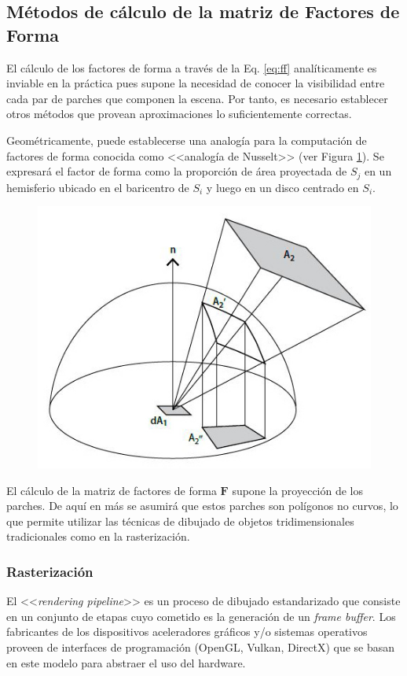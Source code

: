 \subsection{Métodos de cálculo de la matriz de Factores de Forma}
\label{sec:calculoff}

El cálculo de los factores de forma a través de la Eq. \eqref{eq:ff} analíticamente es inviable en la práctica pues supone la necesidad de conocer la visibilidad entre cada par de parches que componen la escena. Por tanto, es necesario establecer otros métodos que provean aproximaciones lo suficientemente correctas.

Geométricamente, puede establecerse una analogía para la computación de factores de forma conocida como <<analogía de Nusselt>> (ver Figura \ref{img:nusselt}). Se expresará el factor de forma como la proporción de área proyectada de $S_{j}$ en un hemisferio ubicado en el baricentro de $S_{i}$ y luego en un disco centrado en $S_{i}$.

\begin{figure}[H]
	\centering
	\includegraphics[width=0.55\linewidth]{assets/nusselt}
	\label{img:nusselt}
\end{figure}

El cálculo de la matriz de factores de forma $\mathbf{F}$ supone la proyección de los parches. De aquí en más se asumirá que estos parches son polígonos no curvos, lo que permite utilizar las técnicas de dibujado de objetos tridimensionales tradicionales como en la rasterización.

\subsubsection{Rasterización}
\label{sec:rasterizacion}

El <<\textit{rendering pipeline}>> es un proceso de dibujado estandarizado que consiste en un conjunto de etapas cuyo cometido es la generación de un \textit{frame buffer}. Los fabricantes de los dispositivos aceleradores gráficos y/o sistemas operativos proveen de interfaces de programación (OpenGL, Vulkan, DirectX) que se basan en este modelo para abstraer el uso del hardware.

